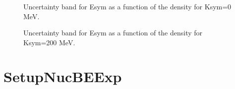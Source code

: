 \documentclass[letterpaper,10pt,english]{sphinxmanual}
\begin{document}
\begin{figure}[htbp]
\centering
\capstart

\noindent{}
\caption{Uncertainty band for Esym as a function of the density for Ksym=0 MeV.}\label{\detokenize{source/api/setup_eos_esym:id2}}\end{figure}

\begin{figure}[htbp]
\centering
\capstart

\noindent{}
\caption{Uncertainty band for Esym as a function of the density for Ksym=200 MeV.}\label{\detokenize{source/api/setup_eos_esym:id3}}\end{figure}

\sphinxstepscope


\section{SetupNucBEExp}
\label{\detokenize{source/api/setup_nuc_be_exp:setupnucbeexp}}\label{\detokenize{source/api/setup_nuc_be_exp::doc}}\label{\detokenize{source/api/setup_nuc_be_exp:module-nucleardatapy.setup_nuc_be_exp}}
\end{document}
